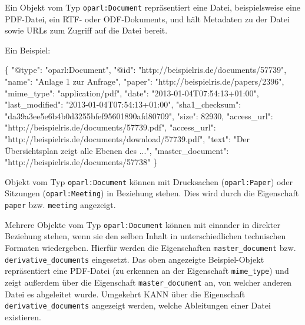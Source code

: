 \documentclass[,a4paper]{article}
\newenvironment{Shaded}{}{}
\newcommand{\DataTypeTok}[1]{\textcolor[rgb]{0.56,0.13,0.00}{{#1}}}
\newcommand{\DecValTok}[1]{\textcolor[rgb]{0.25,0.63,0.44}{{#1}}}
\newcommand{\StringTok}[1]{\textcolor[rgb]{0.25,0.44,0.63}{{#1}}}
\newcommand{\NormalTok}[1]{{#1}}
\begin{document}
Ein Objekt vom Typ \texttt{oparl:Document} repräsentiert eine Datei,
beispielsweise eine PDF-Datei, ein RTF- oder ODF-Dokuments, und hält
Metadaten zu der Datei sowie URLs zum Zugriff auf die Datei bereit.

Ein Beispiel:

\begin{Shaded}
\begin{Highlighting}[]
\NormalTok{\{}
    \DataTypeTok{"@type"}\NormalTok{: }\StringTok{"oparl:Document"}\NormalTok{,}
    \DataTypeTok{"@id"}\NormalTok{: }\StringTok{"http://beispielris.de/documents/57739"}\NormalTok{,}
    \DataTypeTok{"name"}\NormalTok{: }\StringTok{"Anlage 1 zur Anfrage"}\NormalTok{,}
    \DataTypeTok{"paper"}\NormalTok{: }\StringTok{"http://beispielris.de/papers/2396"}\NormalTok{,}
    \DataTypeTok{"mime_type"}\NormalTok{: }\StringTok{"application/pdf"}\NormalTok{,}
    \DataTypeTok{"date"}\NormalTok{: }\StringTok{"2013-01-04T07:54:13+01:00"}\NormalTok{,}
    \DataTypeTok{"last_modified"}\NormalTok{: }\StringTok{"2013-01-04T07:54:13+01:00"}\NormalTok{,}
    \DataTypeTok{"sha1_checksum"}\NormalTok{: }\StringTok{"da39a3ee5e6b4b0d3255bfef95601890afd80709"}\NormalTok{,}
    \DataTypeTok{"size"}\NormalTok{: }\DecValTok{82930}\NormalTok{,}
    \DataTypeTok{"access_url"}\NormalTok{: }\StringTok{"http://beispielris.de/documents/57739.pdf"}\NormalTok{,}
    \DataTypeTok{"access_url"}\NormalTok{: }\StringTok{"http://beispielris.de/documents/download/57739.pdf"}\NormalTok{,}
    \DataTypeTok{"text"}\NormalTok{: }\StringTok{"Der Übersichtsplan zeigt alle Ebenen des ..."}\NormalTok{,}
    \DataTypeTok{"master_document"}\NormalTok{: }\StringTok{"http://beispielris.de/documents/57738"}
\NormalTok{\}}
\end{Highlighting}
\end{Shaded}

Objekt vom Typ \texttt{oparl:Document} können mit Drucksachen
(\texttt{oparl:Paper}) oder Sitzungen (\texttt{oparl:Meeting}) in
Beziehung stehen. Dies wird durch die Eigenschaft \texttt{paper} bzw.
\texttt{meeting} angezeigt.

Mehrere Objekte vom Typ \texttt{oparl:Document} können mit einander in
direkter Beziehung stehen, wenn sie den selben Inhalt in
unterschiedlichen technischen Formaten wiedergeben. Hierfür werden die
Eigenschaften \texttt{master\_document} bzw.
\texttt{derivative\_documents} eingesetzt. Das oben angezeigte
Beispiel-Objekt repräsentiert eine PDF-Datei (zu erkennen an der
Eigenschaft \texttt{mime\_type}) und zeigt außerdem über die Eigenschaft
\texttt{master\_document} an, von welcher anderen Datei es abgeleitet
wurde. Umgekehrt KANN über die Eigenschaft
\texttt{derivative\_documents} angezeigt werden, welche Ableitungen
einer Datei existieren.
\end{document}
